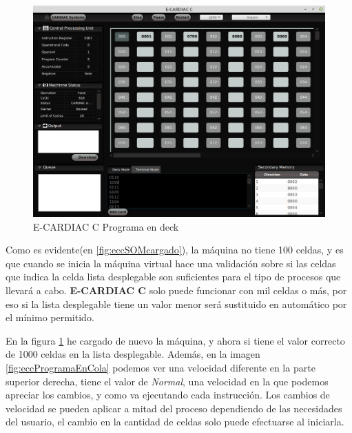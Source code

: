 \documentclass[letterpaper,12pt,oneside]{book}
\begin{document}
        \begin{figure}[h]		
			\centering
			\includegraphics[scale=0.4]{media/CARDIACC/cardiaccProgramaEnDeck.png}
			\caption{E-CARDIAC C Programa en deck}
			\label{fig:eccProgramaenDeck}
		\end{figure}		
   
            Como es evidente(en  \ref{fig:eccSOMcargado}), la máquina no tiene 100 celdas, y es que cuando se inicia la máquina virtual
			hace una validación sobre si las celdas que indica la celda lista desplegable son suficientes para el tipo de procesos que llevará a cabo. \textbf{E-CARDIAC C}
			solo puede funcionar con mil celdas o más, por eso si la lista desplegable tiene un valor menor será sustituido en automático por el mínimo permitido.
   
            En
			la figura \ref{fig:eccProgramaenDeck} he cargado de nuevo la máquina, y ahora si tiene el valor correcto de 1000 celdas en la lista desplegable. Además,
			en la imagen \ref{fig:eccProgramaEnCola} podemos ver una velocidad diferente
            en la parte superior derecha,
			tiene el valor de \textit{Normal}, una velocidad en la que podemos apreciar los cambios, y como va ejecutando cada instrucción. Los cambios de velocidad se pueden aplicar a mitad del proceso dependiendo de las necesidades del usuario, el cambio en la cantidad de celdas solo puede efectuarse al iniciarla.
\end{document}
